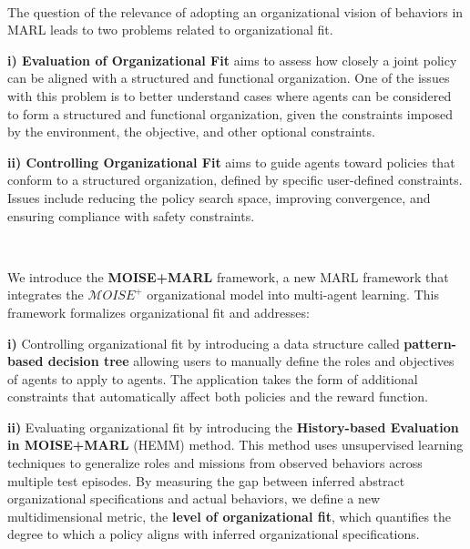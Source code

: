\documentclass[sigconf,anonymous]{aamas}
\begin{document}
\

\noindent The question of the relevance of adopting an organizational vision of behaviors in MARL leads to two problems related to organizational fit.

\quad \textbf{i) Evaluation of Organizational Fit} aims to assess how closely a joint policy can be aligned with a structured and functional organization. One of the issues with this problem is to better understand cases where agents can be considered to form a structured and functional organization, given the constraints imposed by the environment, the objective, and other optional constraints.

\quad \textbf{ii) Controlling Organizational Fit} aims to guide agents toward policies that conform to a structured organization, defined by specific user-defined constraints.
Issues include reducing the policy search space, improving convergence, and ensuring compliance with safety constraints.

\

\noindent We introduce the \textbf{MOISE+MARL} framework, a new MARL framework that integrates the $\mathcal{M}OISE^+$ organizational model into multi-agent learning. This framework formalizes organizational fit and addresses:

\quad \textbf{i)} Controlling organizational fit by introducing a data structure called \textbf{pattern-based decision tree} allowing users to manually define the roles and objectives of agents to apply to agents. The application takes the form of additional constraints that automatically affect both policies and the reward function.

\quad \textbf{ii)} Evaluating organizational fit by introducing the \textbf{History-based Evaluation in MOISE+MARL} (HEMM) method. This method uses unsupervised learning techniques to generalize roles and missions from observed behaviors across multiple test episodes. By measuring the gap between inferred abstract organizational specifications and actual behaviors, we define a new multidimensional metric, the \textbf{level of organizational fit}, which quantifies the degree to which a policy aligns with inferred organizational specifications.
\end{document}
